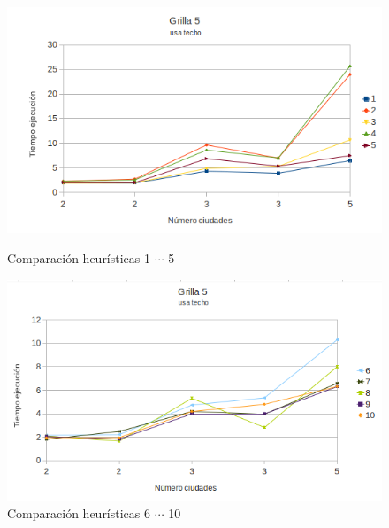 \documentclass[a4paper,10pt]{article}
\begin{document}
\begin{figure}[ht]
\begin{minipage}[b]{0.45\linewidth}
 \centering
 \includegraphics[width=\textwidth]{grilla5ceil0.png}
 \caption{Comparación heurísticas  1 $\cdots$ 5}
 \label{fig:grid5ceil0}
\end{minipage}
\hspace{0.5cm}
\begin{minipage}[b]{0.45\linewidth}
 
\centering
 \includegraphics[width=\textwidth]{grilla5ceil1.png}
 \caption{Comparación heurísticas  6 $\cdots$ 10}
 \label{fig:grid5ceil1}
\end{minipage}


\end{figure}
\end{document}
